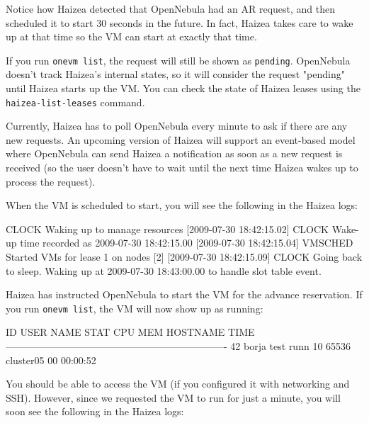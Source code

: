 Notice how Haizea detected that OpenNebula had an AR request, and then scheduled it to start 30 seconds in the future. In fact, Haizea takes care to wake up at that time so the VM can start at exactly that time.

\begin{warning}
If you run \texttt{onevm list}, the request will still be shown as \texttt{pending}. OpenNebula doesn't track Haizea's internal states, so it will consider the request "pending" until Haizea starts up the VM. You can check the state of Haizea leases using the \texttt{haizea-list-leases} command.
\end{warning}

\begin{warning}
Currently, Haizea has to poll OpenNebula every minute to ask if there are any new requests. An upcoming version of Haizea will support an event-based model where OpenNebula can send Haizea a notification as soon as a new request is received (so the user doesn't have to wait until the next time Haizea wakes up to process the request).
\end{warning}

When the VM is scheduled to start, you will see the following in the Haizea logs:

\begin{wideshellverbatim}
[2009-07-30 18:42:15.02] CLOCK   Waking up to manage resources
[2009-07-30 18:42:15.02] CLOCK   Wake-up time recorded as 2009-07-30 18:42:15.00
[2009-07-30 18:42:15.04] VMSCHED Started VMs for lease 1 on nodes [2]
[2009-07-30 18:42:15.09] CLOCK   Going back to sleep. 
                                 Waking up at 2009-07-30 18:43:00.00 
                                 to handle slot table event.
\end{wideshellverbatim}

Haizea has instructed OpenNebula to start the VM for the advance reservation. If you run \texttt{onevm list}, the VM will now show up as running:

\begin{wideshellverbatim}
  ID     USER     NAME STAT CPU     MEM        HOSTNAME        TIME
-------------------------------------------------------------------
  42    borja     test runn  10   65536       cluster05 00 00:00:52
\end{wideshellverbatim}

You should be able to access the VM (if you configured it with networking and SSH). However, since we requested the VM to run for just a minute, you will soon see the following in the Haizea logs:

